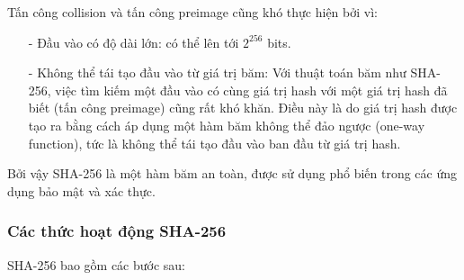 Tấn công collision và tấn công preimage cũng khó thực hiện bởi vì:
\begin{itemize}
    \item[-] Đầu vào có độ dài lớn: có thể lên tới $2^{256}$ bits.
    \item[-] Không thể tái tạo đầu vào từ giá trị băm: Với thuật toán băm như SHA-256, 
    việc tìm kiếm một đầu vào có cùng giá trị hash với một giá trị hash đã biết (tấn công preimage) cũng rất khó khăn. Điều này là do giá trị hash được tạo ra bằng cách áp dụng một hàm băm không thể đảo ngược (one-way function), tức là không thể tái tạo đầu vào ban đầu từ giá trị hash.
\end{itemize}

Bởi vậy SHA-256 là một hàm băm an toàn, được sử dụng phổ biến trong các ứng dụng bảo mật và xác thực.

\subsubsection{Các thức hoạt động SHA-256}
SHA-256 bao gồm các bước sau:

